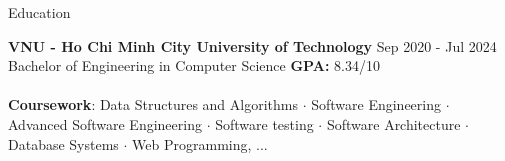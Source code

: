 \documentclass{resume} %
\begin{document}


\begin{rSection}{Education}

{\bf VNU - Ho Chi Minh City University of Technology} \hfill {Sep 2020 - Jul 2024}
\\ Bachelor of Engineering in Computer Science 
\hfill { \textbf{GPA:} 8.34/10}
\\
\\ {\bf Coursework}: Data Structures and Algorithms {$\cdot$} Software Engineering {$\cdot$} Advanced Software Engineering {$\cdot$} Software testing {$\cdot$} Software Architecture {$\cdot$} Database Systems {$\cdot$} Web Programming, ...


\end{rSection}


\end{document}
